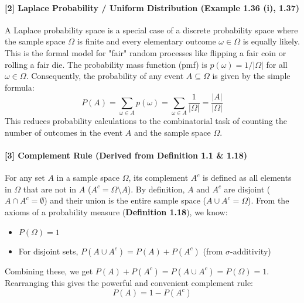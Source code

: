 \documentclass[11pt,a4paper]{article}
\begin{document}
\paragraph{[2] Laplace Probability / Uniform Distribution (Example 1.36 (i), 1.37)}
A Laplace probability space is a special case of a discrete probability space where the sample space $\Omega$ is finite and every elementary outcome $\omega \in \Omega$ is equally likely. This is the formal model for "fair" random processes like flipping a fair coin or rolling a fair die. The probability mass function (pmf) is $p(\omega) = 1/|\Omega|$ for all $\omega \in \Omega$. Consequently, the probability of any event $A \subseteq \Omega$ is given by the simple formula:
\[
P(A) = \sum_{\omega \in A} p(\omega) = \sum_{\omega \in A} \frac{1}{|\Omega|} = \frac{|A|}{|\Omega|}
\]
This reduces probability calculations to the combinatorial task of counting the number of outcomes in the event $A$ and the sample space $\Omega$.

\vspace{1cm}
\hypertarget{note:complement}{\label{note:complement}}
\paragraph{[3] Complement Rule (Derived from Definition 1.1 \& 1.18)}
For any set $A$ in a sample space $\Omega$, its complement $A^c$ is defined as all elements in $\Omega$ that are not in $A$ ($A^c = \Omega \setminus A$). By definition, $A$ and $A^c$ are disjoint ($A \cap A^c = \emptyset$) and their union is the entire sample space ($A \cup A^c = \Omega$).
From the axioms of a probability measure (\textbf{Definition 1.18}), we know:
\begin{itemize}
    \item $P(\Omega) = 1$
    \item For disjoint sets, $P(A \cup A^c) = P(A) + P(A^c)$ (from $\sigma$-additivity)
\end{itemize}
Combining these, we get $P(A) + P(A^c) = P(A \cup A^c) = P(\Omega) = 1$. Rearranging this gives the powerful and convenient complement rule:
\[
P(A) = 1 - P(A^c)
\]
\end{document}
